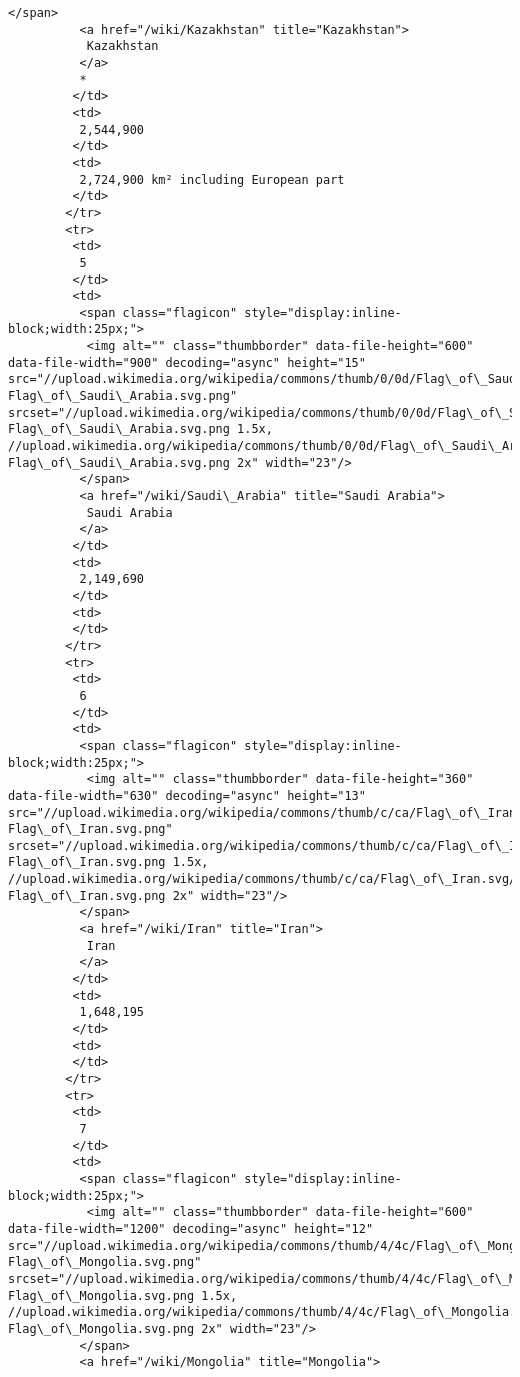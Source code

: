 \documentclass[11pt]{article}
\begin{document}
\begin{Verbatim}[commandchars=\\\{\}]
          </span>
          <a href="/wiki/Kazakhstan" title="Kazakhstan">
           Kazakhstan
          </a>
          *
         </td>
         <td>
          2,544,900
         </td>
         <td>
          2,724,900 km² including European part
         </td>
        </tr>
        <tr>
         <td>
          5
         </td>
         <td>
          <span class="flagicon" style="display:inline-block;width:25px;">
           <img alt="" class="thumbborder" data-file-height="600" data-file-width="900" decoding="async" height="15" src="//upload.wikimedia.org/wikipedia/commons/thumb/0/0d/Flag\_of\_Saudi\_Arabia.svg/23px-Flag\_of\_Saudi\_Arabia.svg.png" srcset="//upload.wikimedia.org/wikipedia/commons/thumb/0/0d/Flag\_of\_Saudi\_Arabia.svg/35px-Flag\_of\_Saudi\_Arabia.svg.png 1.5x, //upload.wikimedia.org/wikipedia/commons/thumb/0/0d/Flag\_of\_Saudi\_Arabia.svg/45px-Flag\_of\_Saudi\_Arabia.svg.png 2x" width="23"/>
          </span>
          <a href="/wiki/Saudi\_Arabia" title="Saudi Arabia">
           Saudi Arabia
          </a>
         </td>
         <td>
          2,149,690
         </td>
         <td>
         </td>
        </tr>
        <tr>
         <td>
          6
         </td>
         <td>
          <span class="flagicon" style="display:inline-block;width:25px;">
           <img alt="" class="thumbborder" data-file-height="360" data-file-width="630" decoding="async" height="13" src="//upload.wikimedia.org/wikipedia/commons/thumb/c/ca/Flag\_of\_Iran.svg/23px-Flag\_of\_Iran.svg.png" srcset="//upload.wikimedia.org/wikipedia/commons/thumb/c/ca/Flag\_of\_Iran.svg/35px-Flag\_of\_Iran.svg.png 1.5x, //upload.wikimedia.org/wikipedia/commons/thumb/c/ca/Flag\_of\_Iran.svg/46px-Flag\_of\_Iran.svg.png 2x" width="23"/>
          </span>
          <a href="/wiki/Iran" title="Iran">
           Iran
          </a>
         </td>
         <td>
          1,648,195
         </td>
         <td>
         </td>
        </tr>
        <tr>
         <td>
          7
         </td>
         <td>
          <span class="flagicon" style="display:inline-block;width:25px;">
           <img alt="" class="thumbborder" data-file-height="600" data-file-width="1200" decoding="async" height="12" src="//upload.wikimedia.org/wikipedia/commons/thumb/4/4c/Flag\_of\_Mongolia.svg/23px-Flag\_of\_Mongolia.svg.png" srcset="//upload.wikimedia.org/wikipedia/commons/thumb/4/4c/Flag\_of\_Mongolia.svg/35px-Flag\_of\_Mongolia.svg.png 1.5x, //upload.wikimedia.org/wikipedia/commons/thumb/4/4c/Flag\_of\_Mongolia.svg/46px-Flag\_of\_Mongolia.svg.png 2x" width="23"/>
          </span>
          <a href="/wiki/Mongolia" title="Mongolia">

\end{Verbatim}
\end{document}

